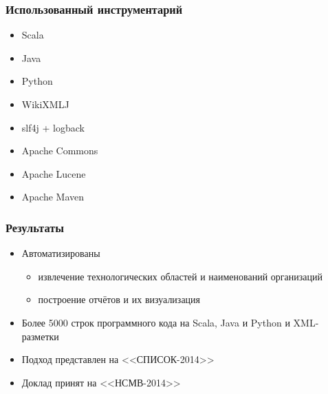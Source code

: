 \documentclass{beamer}
\begin{document}
\begin{frame}\frametitle{Использованный инструментарий}

\begin{itemize}
    \item Scala
    \item Java
    \item Python
    \item WikiXMLJ
    \item slf4j + logback
    \item Apache Commons
    \item Apache Lucene
    \item Apache Maven
\end{itemize}

\end{frame}


\begin{frame}\frametitle{Результаты}
\begin{itemize}
    \item Автоматизированы 
    \begin{itemize}
        \item извлечение технологических областей и наименований организаций
        \item построение отчётов и их визуализация
    \end{itemize}
    \item Более 5000 строк программного кода на Scala, Java и Python и XML-разметки
    \item Подход представлен на <<СПИСОК-2014>>
    \item Доклад принят на <<НСМВ-2014>>
\end{itemize}
\end{frame}


{
\frame{\titlepage\label{lastframe}}
}

\end{document}

